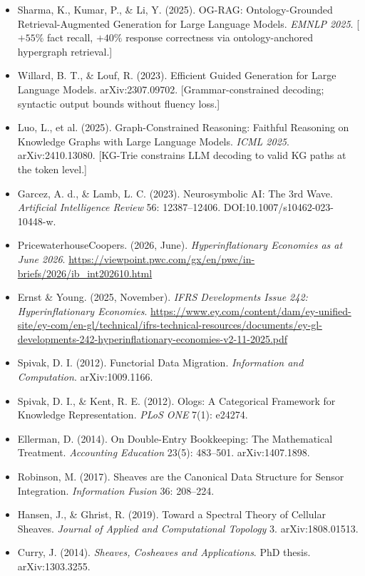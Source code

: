 \documentclass[12pt]{clapps}  %
\begin{document}
\begin{itemize}
    \item Sharma, K., Kumar, P., \& Li, Y. (2025). OG-RAG: Ontology-Grounded Retrieval-Augmented Generation for Large Language Models. \textit{EMNLP 2025}. [$+55\%$ fact recall, $+40\%$ response correctness via ontology-anchored hypergraph retrieval.]
    \item Willard, B. T., \& Louf, R. (2023). Efficient Guided Generation for Large Language Models. arXiv:2307.09702. [Grammar-constrained decoding; syntactic output bounds without fluency loss.]
    \item Luo, L., et al. (2025). Graph-Constrained Reasoning: Faithful Reasoning on Knowledge Graphs with Large Language Models. \textit{ICML 2025}. arXiv:2410.13080. [KG-Trie constrains LLM decoding to valid KG paths at the token level.]
    \item Garcez, A. d., \& Lamb, L. C. (2023). Neurosymbolic AI: The 3rd Wave. \textit{Artificial Intelligence Review} 56: 12387--12406. DOI:10.1007/s10462-023-10448-w.
    \item PricewaterhouseCoopers. (2026, June). \textit{Hyperinflationary Economies as at June 2026}. \url{https://viewpoint.pwc.com/gx/en/pwc/in-briefs/2026/ib_int202610.html}
    \item Ernst \& Young. (2025, November). \textit{IFRS Developments Issue 242: Hyperinflationary Economies}. \url{https://www.ey.com/content/dam/ey-unified-site/ey-com/en-gl/technical/ifrs-technical-resources/documents/ey-gl-developments-242-hyperinflationary-economies-v2-11-2025.pdf}
    \item Spivak, D. I. (2012). Functorial Data Migration. \textit{Information and Computation}. arXiv:1009.1166.
    \item Spivak, D. I., \& Kent, R. E. (2012). Ologs: A Categorical Framework for Knowledge Representation. \textit{PLoS ONE} 7(1): e24274.
    \item Ellerman, D. (2014). On Double-Entry Bookkeeping: The Mathematical Treatment. \textit{Accounting Education} 23(5): 483--501. arXiv:1407.1898.
    \item Robinson, M. (2017). Sheaves are the Canonical Data Structure for Sensor Integration. \textit{Information Fusion} 36: 208--224.
    \item Hansen, J., \& Ghrist, R. (2019). Toward a Spectral Theory of Cellular Sheaves. \textit{Journal of Applied and Computational Topology} 3. arXiv:1808.01513.
    \item Curry, J. (2014). \textit{Sheaves, Cosheaves and Applications}. PhD thesis. arXiv:1303.3255.

\end{itemize}
\end{document}
